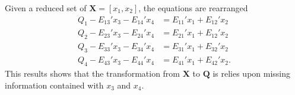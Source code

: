 \documentclass[aps,prb,preprint,preprintnumbers,amsmath,amssymb,floatfix,superscriptaddress]{revtex4}
\begin{document}
Given a reduced set of $\pmb{X}= [x_1,x_2]$, the equations are rearranged
\begin{equation}
\begin{split}
Q_1-E_{13}'x_3-E_{14}'x_4&= E_{11}'x_1 + E_{12}'x_2\\
Q_2-E_{23}'x_3-E_{24}'x_4&= E_{21}'x_1 + E_{12}'x_2\\
Q_3-E_{33}'x_3-E_{34}'x_4&= E_{31}'x_1 + E_{32}'x_2\\
Q_4-E_{43}'x_3-E_{44}'x_4&= E_{41}'x_1 + E_{42}'x_2.
\end{split}
\end{equation}
This results shows that the transformation from $\pmb{X}$ to $\pmb{Q}$ is relies upon missing information contained with $x_3$ and $x_4$.
\end{document}
